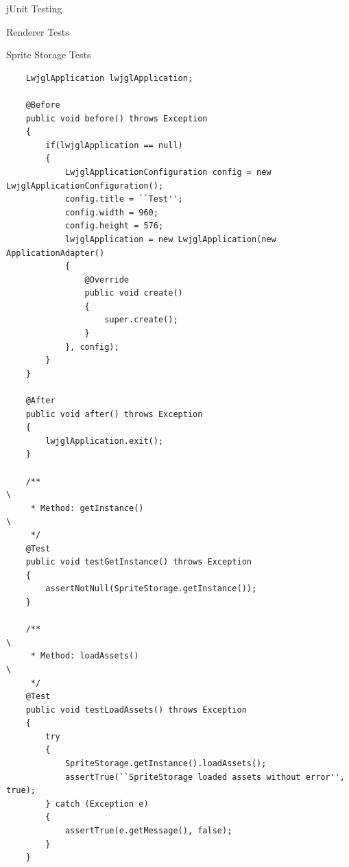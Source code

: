 \documentclass[12pt]{report}
\begin{document}
\begin{chapter}{jUnit Testing}
\begin{section}{Renderer Tests}
\begin{subsection}{Sprite Storage Tests}
\begin{lstlisting}
    LwjglApplication lwjglApplication;

    @Before
    public void before() throws Exception
    {
        if(lwjglApplication == null)
        {
            LwjglApplicationConfiguration config = new LwjglApplicationConfiguration();
            config.title = ``Test'';
            config.width = 960;
            config.height = 576;
            lwjglApplication = new LwjglApplication(new ApplicationAdapter()
            {
                @Override
                public void create()
                {
                    super.create();
                }
            }, config);
        }
    }
    
    @After
    public void after() throws Exception
    {
        lwjglApplication.exit();
    }

    /**                                                                                  \
     * Method: getInstance()                                                             \
     */
    @Test
    public void testGetInstance() throws Exception
    {
        assertNotNull(SpriteStorage.getInstance());
    }

    /**                                                                                  \
     * Method: loadAssets()                                                              \
     */
    @Test
    public void testLoadAssets() throws Exception
    {
        try
        {
            SpriteStorage.getInstance().loadAssets();
            assertTrue(``SpriteStorage loaded assets without error'', true);
        } catch (Exception e)
        {
            assertTrue(e.getMessage(), false);
        }
    }


\end{lstlisting}
\end{subsection}
\end{section}
\end{chapter}
\end{document}
